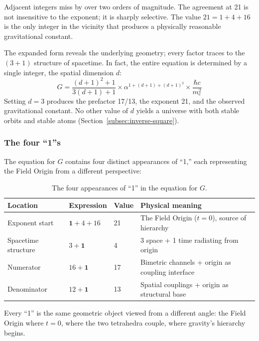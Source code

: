 \documentclass[aps,prd,preprint,superscriptaddress,showpacs,preprintnumbers,amsmath,amssymb,nofootinbib]{revtex4-2}
\begin{document}
Adjacent integers miss by over two orders of magnitude. The agreement at 21 is not insensitive to the exponent; it is sharply selective. The value $21 = 1 + 4 + 16$ is the only integer in the vicinity that produces a physically reasonable gravitational constant.

The expanded form reveals the underlying geometry; every factor traces to the $(3+1)$ structure of spacetime. In fact, the entire equation is determined by a single integer, the spatial dimension $d$:
\begin{equation}
G = \frac{(d+1)^2 + 1}{3(d+1) + 1} \times \alpha^{1 + (d+1) + (d+1)^2} \times \frac{\hbar c}{m_e^2}
\label{eq:G-general-d}
\end{equation}
Setting $d = 3$ produces the prefactor 17/13, the exponent 21, and the observed gravitational constant. No other value of $d$ yields a universe with both stable orbits and stable atoms (Section~\ref{subsec:inverse-square}).

\subsubsection*{The four ``1''s}

The equation for $G$ contains four distinct appearances of ``1,'' each representing the Field Origin from a different perspective:

\begin{table}[H]
\centering
\begin{tabular*}{\textwidth}{@{\extracolsep{\fill}} llll @{}}
\toprule
\textbf{Location} & \textbf{Expression} & \textbf{Value} & \textbf{Physical meaning} \\
\midrule
Exponent start & $\mathbf{1} + 4 + 16$ & 21 & The Field Origin ($t = 0$), source of hierarchy \\
Spacetime structure & $3 + \mathbf{1}$ & 4 & 3 space + 1 time radiating from origin \\
Numerator & $16 + \mathbf{1}$ & 17 & Bimetric channels + origin as coupling interface \\
Denominator & $12 + \mathbf{1}$ & 13 & Spatial couplings + origin as structural base \\
\bottomrule
\end{tabular*}
\caption{The four appearances of ``1'' in the equation for $G$.}
\label{tab:ones}
\end{table}

Every ``1'' is the same geometric object viewed from a different angle: the Field Origin where $t = 0$, where the two tetrahedra couple, where gravity's hierarchy begins.
\end{document}
